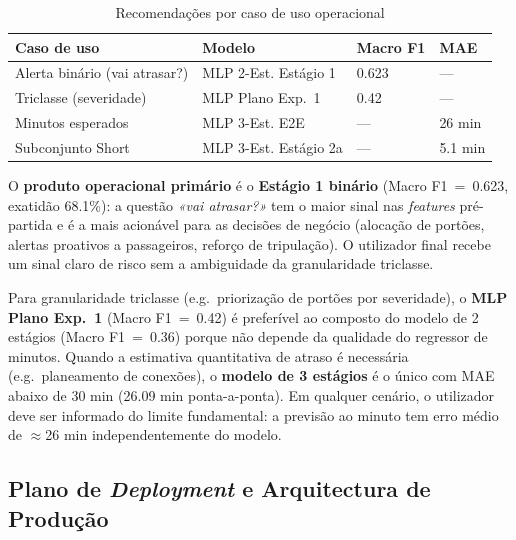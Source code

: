 \documentclass[conference]{IEEEtran}
\begin{document}
\begin{table}[h]
\centering
\caption{Recomendações por caso de uso operacional}
\label{tab:prod_rec}
\setlength{\tabcolsep}{3pt}
\begin{tabular}{p{2.0cm}p{2.0cm}p{1.4cm}p{1.5cm}}
\toprule
\textbf{Caso de uso} & \textbf{Modelo} & \textbf{Macro F1} & \textbf{MAE} \\
\midrule
Alerta binário (vai atrasar?) & MLP 2-Est. Estágio 1 & 0.623 & — \\
Triclasse (severidade) & MLP Plano Exp.~1 & 0.42 & — \\
Minutos esperados & MLP 3-Est. E2E & — & 26 min \\
Subconjunto Short & MLP 3-Est. Estágio 2a & — & 5.1 min \\
\bottomrule
\end{tabular}
\end{table}

O \textbf{produto operacional primário} é o \textbf{Estágio 1 binário}
(Macro F1~=~0.623, exatidão 68.1\%): a questão \textit{«vai atrasar?»} tem o
maior sinal nas \textit{features} pré-partida e é a mais acionável para as
decisões de negócio (alocação de portões, alertas proativos a passageiros,
reforço de tripulação). O utilizador final recebe um sinal claro de risco
sem a ambiguidade da granularidade triclasse.

Para granularidade triclasse (e.g.\ priorização de portões por severidade),
o \textbf{MLP Plano Exp.~1} (Macro F1~=~0.42) é preferível ao composto do
modelo de 2 estágios (Macro F1~=~0.36) porque não depende da qualidade do
regressor de minutos. Quando a estimativa quantitativa de atraso é necessária
(e.g.\ planeamento de conexões), o \textbf{modelo de 3 estágios} é o único com
MAE abaixo de 30 min (26.09 min ponta-a-ponta). Em qualquer cenário, o
utilizador deve ser informado do limite fundamental: a previsão ao minuto tem
erro médio de $\approx$26 min independentemente do modelo.

\subsection{Plano de \textit{Deployment} e Arquitectura de Produção}
\end{document}
